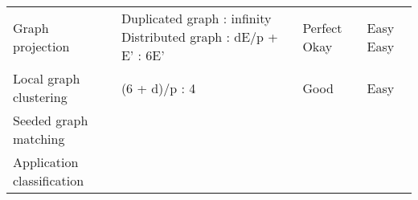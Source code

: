 \documentclass[10pt,oneside]{memoir}
\begin{document}
\begin{longtable}[]{@{}llll@{}}
\begin{minipage}[t]{0.28\columnwidth}
Graph projection\strut
\end{minipage} & \begin{minipage}[t]{0.35\columnwidth}\raggedright
Duplicated graph : infinity Distributed graph : dE/p + E' : 6E'\strut
\end{minipage} & \begin{minipage}[t]{0.13\columnwidth}\raggedright
Perfect Okay\strut
\end{minipage} & \begin{minipage}[t]{0.13\columnwidth}\raggedright
Easy Easy\strut
\end{minipage}\tabularnewline
\begin{minipage}[t]{0.28\columnwidth}\raggedright
Local graph clustering\strut
\end{minipage} & \begin{minipage}[t]{0.35\columnwidth}\raggedright
(6 + d)/p : 4\strut
\end{minipage} & \begin{minipage}[t]{0.13\columnwidth}\raggedright
Good\strut
\end{minipage} & \begin{minipage}[t]{0.13\columnwidth}\raggedright
Easy\strut
\end{minipage}\tabularnewline
\begin{minipage}[t]{0.28\columnwidth}\raggedright
Seeded graph matching\strut
\end{minipage} & \begin{minipage}[t]{0.35\columnwidth}\raggedright
\strut
\end{minipage} & \begin{minipage}[t]{0.13\columnwidth}\raggedright
\strut
\end{minipage} & \begin{minipage}[t]{0.13\columnwidth}\raggedright
\strut
\end{minipage}\tabularnewline
\begin{minipage}[t]{0.28\columnwidth}\raggedright
Application classification\strut
\end{minipage} & \begin{minipage}[t]{0.35\columnwidth}\raggedright
\strut
\end{minipage} & \begin{minipage}[t]{0.13\columnwidth}\raggedright
\strut
\end{minipage} & \begin{minipage}[t]{0.13\columnwidth}\raggedright
\strut
\end{minipage}\tabularnewline
\bottomrule
\end{longtable}
\end{document}
